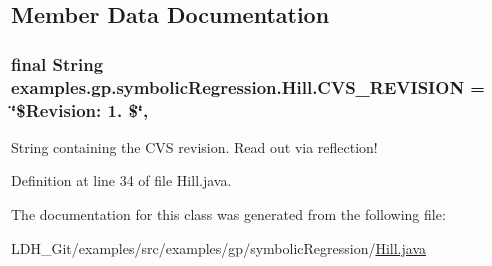\subsection{Member Data Documentation}
\hypertarget{classexamples_1_1gp_1_1symbolic_regression_1_1_hill_a0c4f0e33aed4e6afd8083d43680882f4}{
\subsubsection[{C\-V\-S\-\_\-\-R\-E\-V\-I\-S\-I\-O\-N}]{\setlength{\rightskip}{0pt plus 5cm}final String examples.\-gp.\-symbolic\-Regression.\-Hill.\-C\-V\-S\-\_\-\-R\-E\-V\-I\-S\-I\-O\-N = \char`\"{}\$Revision\-: 1. \$\char`\"{}\hspace{0.3cm}{\ttfamily [static]}, {\ttfamily [private]}}}\label{classexamples_1_1gp_1_1symbolic_regression_1_1_hill_a0c4f0e33aed4e6afd8083d43680882f4}
String containing the C\-V\-S revision. Read out via reflection! 

Definition at line 34 of file Hill.\-java.



The documentation for this class was generated from the following file\-:\begin{DoxyCompactItemize}
\item 
L\-D\-H\-\_\-\-Git/examples/src/examples/gp/symbolic\-Regression/\hyperlink{_hill_8java}{Hill.\-java}\end{DoxyCompactItemize}
